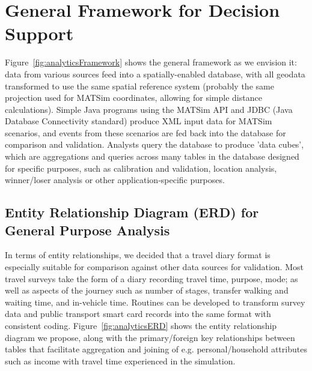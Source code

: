 \section{General Framework for Decision Support}
Figure~\ref{fig:analyticsFramework} shows the general framework as we envision it: data from various sources feed into a spatially-enabled database, with all geodata transformed to use the same spatial reference system (probably the same projection used for MATSim coordinates, allowing for simple distance calculations). Simple Java programs using the MATSim API and JDBC (Java Database Connectivity standard) produce XML input data for MATSim scenarios, and events from these scenarios are fed back into the database for comparison and validation. Analysts query the database to produce 'data cubes', which are aggregations and queries across many tables in the database designed for specific purposes, such as calibration and validation, location analysis, winner/loser analysis or other application-specific purposes.

\subsection{Entity Relationship Diagram (ERD) for General Purpose Analysis}
In terms of entity relationships, we decided that a travel diary format is especially suitable for comparison against other data sources for validation. Most travel surveys take the form of a diary recording travel time, purpose, mode; as well as aspects of the journey such as number of stages, transfer walking and waiting time, and in-vehicle time. Routines can be developed to transform survey data  and public transport smart card records into the same format with consistent coding. Figure~\ref{fig:analyticsERD} shows the entity relationship diagram  we propose, along with the primary/foreign key relationships between tables that facilitate aggregation and joining of e.g. personal/household attributes such as income with travel time experienced in the simulation.

